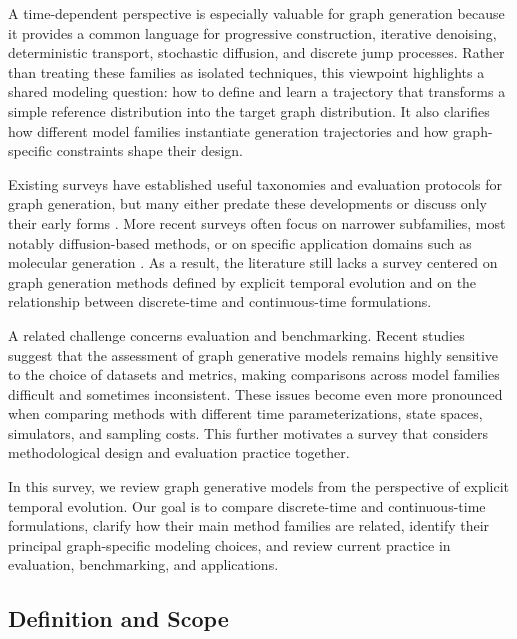 \documentclass{article}
\begin{document}
A time-dependent perspective is especially valuable for graph generation because it provides a common language for progressive construction, iterative denoising, deterministic transport, stochastic diffusion, and discrete jump processes. Rather than treating these families as isolated techniques, this viewpoint highlights a shared modeling question: how to define and learn a trajectory that transforms a simple reference distribution into the target graph distribution. It also clarifies how different model families instantiate generation trajectories and how graph-specific constraints shape their design.


Existing surveys have established useful taxonomies and evaluation protocols for graph generation, but many either predate these developments or discuss only their early forms \cite{faez2021deep,zhu2022survey,guo2022systematic,bonifati2020graph}. More recent surveys often focus on narrower subfamilies, most notably diffusion-based methods, or on specific application domains such as molecular generation \cite{liu2023generative,chen2024diffusion,wang2025diffusion}. As a result, the literature still lacks a survey centered on graph generation methods defined by explicit temporal evolution and on the relationship between discrete-time and continuous-time formulations.


A related challenge concerns evaluation and benchmarking. Recent studies \cite{thompson2022evaluation} suggest that the assessment of graph generative models remains highly sensitive to the choice of datasets and metrics, making comparisons across model families difficult and sometimes inconsistent. These issues become even more pronounced when comparing methods with different time parameterizations, state spaces, simulators, and sampling costs. This further motivates a survey that considers methodological design and evaluation practice together.

In this survey, we review graph generative models from the perspective of explicit temporal evolution. Our goal is to compare discrete-time and continuous-time formulations, clarify how their main method families are related, identify their principal graph-specific modeling choices, and review current practice in evaluation, benchmarking, and applications.

\subsection{Definition and Scope}
\label{sec:definition_scope}
\end{document}
